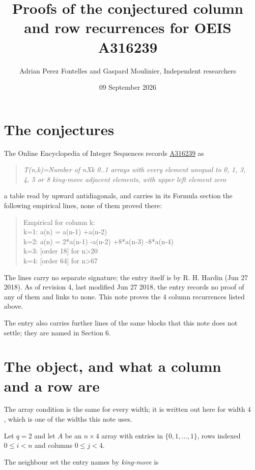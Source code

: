 \documentclass[11pt]{article}
\title{Proofs of the conjectured column and row recurrences for OEIS A316239}
\author{Adrian Perez Fontelles and Gaspard Moulinier, Independent researchers}
\date{09 September 2026}
\theoremstyle{definition}
\begin{document}
\maketitle
\section{The conjectures}

The Online Encyclopedia of Integer Sequences records \href{https://oeis.org/A316239}{A316239} as

\begin{quote}\itshape T(n,k)=Number of nXk 0..1 arrays with every element unequal to 0, 1, 3, 4, 5 or 8 king-move adjacent elements, with upper left element zero\end{quote}

a table read by upward antidiagonals, and carries in its Formula section the following empirical lines, none of them proved there:

\begin{quote}\ttfamily Empirical for column k:\\
k=1: a(n) = a(n-1) +a(n-2)\\k=2: a(n) = 2*a(n-1) -a(n-2) +8*a(n-3) -8*a(n-4)\\k=3: [order 18] for n>20\\k=4: [order 64] for n>67\end{quote}

The lines carry no separate signature; the entry itself is by R. H. Hardin (Jun 27 2018). As of revision 4, last modified Jun 27 2018, the entry records no proof of any of them and links to none. This note proves the 4 column recurrences listed above.

The entry also carries further lines of the same blocks that this note does not settle; they are named in Section 6.

\section{The object, and what a column and a row are}

The array condition is the same for every width; it is written out here for width $4$, which is one of the widths this note uses.

Let $q = 2$ and let $A$ be an $n \times 4$ array with entries in $\{0,1,\dots,1\}$, rows indexed $0 \le i < n$ and columns $0 \le j < 4$.

The neighbour set the entry names by {\itshape king-move} is
\end{document}
